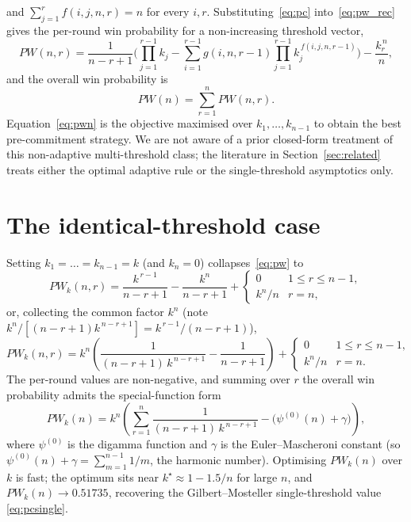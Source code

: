 \documentclass[11pt]{article}
\begin{document}
and $\sum_{j=1}^{r}f(i,j,n,r)=n$ for every $i,r$. Substituting~\eqref{eq:pc}
into~\eqref{eq:pw_rec} gives the per-round win probability for a non-increasing threshold
vector,
\begin{equation}\label{eq:pw}
  PW(n,r)=\frac{1}{n-r+1}\Biggl(\prod_{j=1}^{r-1}k_j
        -\sum_{i=1}^{r-1}g(i,n,r-1)\prod_{j=1}^{r-1}k_j^{\,f(i,j,n,r-1)}\Biggr)-\frac{k_r^{\,n}}{n},
\end{equation}
and the overall win probability is
\begin{equation}\label{eq:pwn}
  PW(n)=\sum_{r=1}^{n}PW(n,r).
\end{equation}
Equation~\eqref{eq:pwn} is the objective maximised over $k_1,\dots,k_{n-1}$ to obtain
the best pre-commitment strategy. We are not aware of a prior closed-form treatment of
this non-adaptive multi-threshold class; the literature in
Section~\ref{sec:related} treats either the optimal adaptive rule or the single-threshold
asymptotics only.

\section{The identical-threshold case}\label{sec:identical}

Setting $k_1=\dots=k_{n-1}=k$ (and $k_n=0$) collapses~\eqref{eq:pw} to
\begin{equation}\label{eq:pwk}
  PW_k(n,r)=\frac{k^{\,r-1}}{n-r+1}-\frac{k^{n}}{n-r+1}
            +\begin{cases}0 & 1\le r\le n-1,\\[2pt] k^{n}/n & r=n,\end{cases}
\end{equation}
or, collecting the common factor $k^{n}$ (note $k^{n}/[(n-r+1)k^{\,n-r+1}]=k^{\,r-1}/(n-r+1)$),
\begin{equation}\label{eq:pwk2}
  PW_k(n,r)=k^{n}\!\left(\frac{1}{(n-r+1)\,k^{\,n-r+1}}-\frac{1}{n-r+1}\right)
            +\begin{cases}0 & 1\le r\le n-1,\\[2pt] k^{n}/n & r=n.\end{cases}
\end{equation}
The per-round values are non-negative, and summing over $r$ the overall win probability
admits the special-function form
\begin{equation}\label{eq:pwk_total}
  PW_k(n)=k^{n}\!\left(\sum_{r=1}^{n}\frac{1}{(n-r+1)\,k^{\,n-r+1}}-\bigl(\psi^{(0)}(n)+\gamma\bigr)\right),
\end{equation}
where $\psi^{(0)}$ is the digamma function and $\gamma$ is the Euler--Mascheroni
constant (so $\psi^{(0)}(n)+\gamma=\sum_{m=1}^{n-1}1/m$, the harmonic number). Optimising
$PW_k(n)$ over $k$ is fast; the optimum sits near $k^\star\approx 1-1.5/n$ for large
$n$, and $PW_k(n)\to 0.51735$, recovering the Gilbert--Mosteller single-threshold value
\eqref{eq:pcsingle}.
\end{document}
